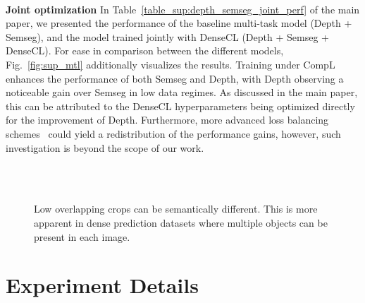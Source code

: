 \documentclass[10pt,twocolumn,letterpaper]{article}
\newcommand{\parsection}[1]{\vspace{1mm}\noindent\textbf{#1 }}
\begin{document}
\begin{figure*}[t!]
 \centering
 \vspace{-0.2in}
      ~
\caption{Performance of (a) monocular depth estimation (Depth) and  (b) semantic segmentation (Semseg) on NYUD-v2 for their multi-task model. The multi-task model combined with CompL yields consistent improvements in both tasks.}
\vspace{-0.1in}
\label{fig:sup_mtl}
\end{figure*}

\parsection{Joint optimization}
In 
Table~\ref{table_sup:depth_semseg_joint_perf}
of the main paper, we presented the performance of the baseline multi-task model (Depth + Semseg), and the model trained jointly with DenseCL (Depth + Semseg + DenseCL). 
For ease in comparison between the different models, Fig.~\ref{fig:sup_mtl} additionally visualizes the results.
Training under CompL enhances the performance of both Semseg and Depth, with Depth observing a noticeable gain over Semseg in low data regimes. 
As discussed in the main paper, this can be attributed to the DenseCL hyperparameters being optimized directly for the improvement of Depth.
Furthermore, more advanced loss balancing schemes~\cite{chen2018gradnorm} could yield a redistribution of the performance gains, however, such investigation is beyond the scope of our work.

 \begin{figure}[t]
 \centering
\\
~
\caption{Low overlapping crops can be semantically different. This is more apparent in dense prediction datasets where multiple objects can be present in each image.}\label{fig:segm_crop}
\vspace{3.9in}
\end{figure}

\section{Experiment Details}
\end{document}
